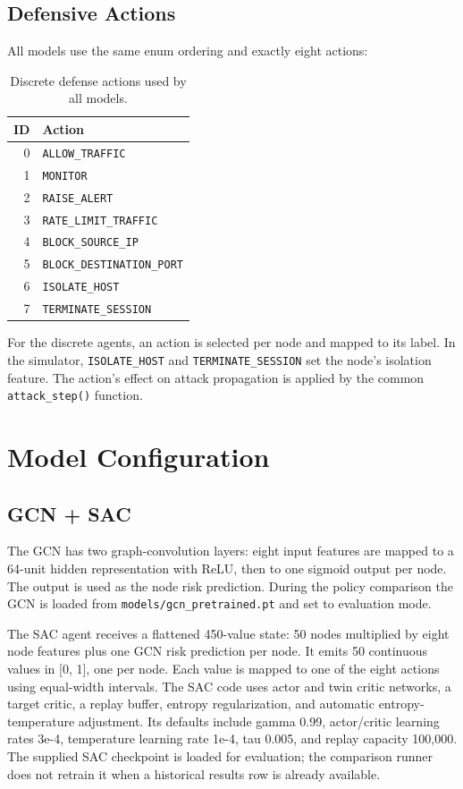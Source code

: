 \documentclass[12pt,a4paper]{report}
\newcommand{\code}[1]{\texttt{#1}}
\begin{document}
\subsection{Defensive Actions}

All models use the same enum ordering and exactly eight actions:

\begin{table}[htbp]
\centering
\caption{Discrete defense actions used by all models.}
\begin{tabular}{rl}
\toprule
\textbf{ID} & \textbf{Action} \\
\midrule
0 & \code{ALLOW\_TRAFFIC} \\
1 & \code{MONITOR} \\
2 & \code{RAISE\_ALERT} \\
3 & \code{RATE\_LIMIT\_TRAFFIC} \\
4 & \code{BLOCK\_SOURCE\_IP} \\
5 & \code{BLOCK\_DESTINATION\_PORT} \\
6 & \code{ISOLATE\_HOST} \\
7 & \code{TERMINATE\_SESSION} \\
\bottomrule
\end{tabular}
\end{table}

For the discrete agents, an action is selected per node and mapped to its label. In the simulator, \code{ISOLATE\_HOST} and \code{TERMINATE\_SESSION} set the node's isolation feature. The action's effect on attack propagation is applied by the common \code{attack\_step()} function.

\section{Model Configuration}

\subsection{GCN + SAC}

The GCN has two graph-convolution layers: eight input features are mapped to a 64-unit hidden representation with ReLU, then to one sigmoid output per node. The output is used as the node risk prediction. During the policy comparison the GCN is loaded from \code{models/gcn\_pretrained.pt} and set to evaluation mode.

The SAC agent receives a flattened 450-value state: 50 nodes multiplied by eight node features plus one GCN risk prediction per node. It emits 50 continuous values in [0, 1], one per node. Each value is mapped to one of the eight actions using equal-width intervals. The SAC code uses actor and twin critic networks, a target critic, a replay buffer, entropy regularization, and automatic entropy-temperature adjustment. Its defaults include gamma 0.99, actor/critic learning rates 3e-4, temperature learning rate 1e-4, tau 0.005, and replay capacity 100,000. The supplied SAC checkpoint is loaded for evaluation; the comparison runner does not retrain it when a historical results row is already available.
\end{document}
